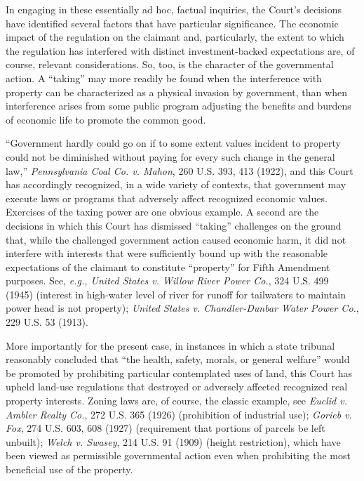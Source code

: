In engaging in these essentially ad hoc, factual inquiries, the Court's
decisions have identified several factors that have particular significance. The
economic impact of the regulation on the claimant and, particularly, the extent
to which the regulation has interfered with distinct investment-backed
expectations are, of course, relevant considerations. So, too, is the character
of the governmental action. A ``taking'' may more readily be found when the
interference with property can be characterized as a physical invasion by
government, than when interference arises from some public program adjusting the
benefits and burdens of economic life to promote the common good.

``Government hardly could go on if to some extent values incident to property
could not be diminished without paying for every such change in the general
law,'' \textit{Pennsylvania Coal Co. v. Mahon}, 260 U.S. 393, 413 (1922), and
this Court has accordingly recognized, in a wide variety of contexts, that
government may execute laws or programs that adversely affect recognized
economic values. Exercises of the taxing power are one obvious example. A second
are the decisions in which this Court has dismissed ``taking'' challenges on the
ground that, while the challenged government action caused economic harm, it did
not interfere with interests that were sufficiently bound up with the reasonable
expectations of the claimant to constitute ``property'' for Fifth Amendment
purposes. See, \textit{e.g., United States v. Willow River Power Co.}, 324 U.S.
499 (1945) (interest in high-water level of river for runoff for tailwaters to
maintain power head is not property); \textit{United States v. Chandler-Dunbar
Water Power Co.}, 229 U.S. 53 (1913).

More importantly for the present case, in instances in which a state tribunal
reasonably concluded that ``the health, safety, morals, or general welfare''
would be promoted by prohibiting particular contemplated uses of land, this
Court has upheld land-use regulations that destroyed or adversely affected
recognized real property interests. Zoning laws are, of course, the classic
example, see \textit{Euclid v. Ambler Realty Co.}, 272 U.S. 365 (1926)
(prohibition of industrial use); \textit{Gorieb v. Fox}, 274 U.S. 603, 608
(1927) (requirement that portions of parcels be left unbuilt); \textit{Welch v.
Swasey}, 214 U.S. 91 (1909) (height restriction), which have been viewed as
permissible governmental action even when prohibiting the most beneficial use of
the property. 

